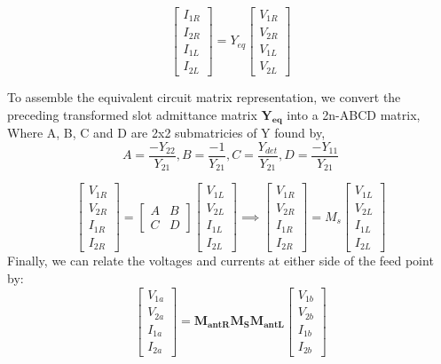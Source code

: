 \documentclass{article}
\begin{document}
\begin{equation}
	\begin{bmatrix}I_{1R}\\I_{2R}\\I_{1L}\\I_{2L}\end{bmatrix}={Y_{eq}}\begin{bmatrix}V_{1R}\\V_{2R}\\V_{1L}\\V_{2L}\end{bmatrix}
\end{equation}

To assemble the equivalent circuit matrix representation, we convert the preceding transformed slot admittance matrix $\mathbf{Y_{eq}}$ into a 2n-ABCD matrix, Where A, B, C and D are 2x2 submatricies of Y found by, 
\begin{equation}
A = \frac{-Y_{22}}{Y_{21}},
 B = \frac{-1}{Y_{21}},
 C = \frac{Y_{det}}{Y_{21}},
 D = \frac{-Y_{11}}{Y_{21}}
\end{equation} 

\begin{equation}
\begin{bmatrix}V_{1R}\\V_{2R}\\I_{1R}\\I_{2R}\end{bmatrix} = \begin{bmatrix}A&B\\C&D\end{bmatrix} \begin{bmatrix}V_{1L}\\V_{2L}\\I_{1L}\\I_{2L}\end{bmatrix} \implies \begin{bmatrix}V_{1R}\\V_{2R}\\I_{1R}\\I_{2R}\end{bmatrix} = M_{s} \begin{bmatrix}V_{1L}\\V_{2L}\\I_{1L}\\I_{2L}\end{bmatrix}
\end{equation}
Finally, we can relate the voltages and currents at either side of the feed point by: 
\begin{equation}
	\begin{bmatrix}V_{1a}\\V_{2a}\\I_{1a}\\I_{2a}\end{bmatrix} = \mathbf{M_{antR} M_S M_{antL}} \begin{bmatrix}V_{1b}\\V_{2b}\\I_{1b}\\I_{2b}\end{bmatrix}
\end{equation}
\end{document}
